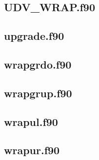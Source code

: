 \subsection{UDV\_WRAP.f90}
\subsection{upgrade.f90}
\subsection{wrapgrdo.f90}
\subsection{wrapgrup.f90}
\subsection{wrapul.f90}
\subsection{wrapur.f90}